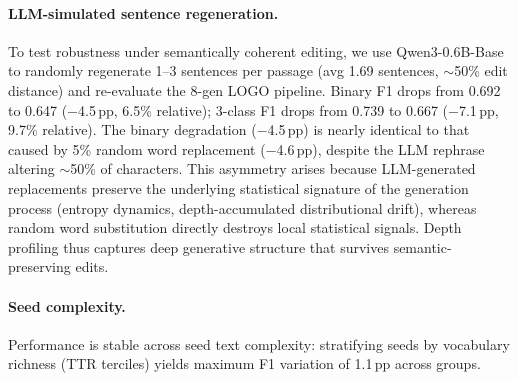 \paragraph{LLM-simulated sentence regeneration.}
To test robustness under semantically coherent editing, we use Qwen3-0.6B-Base to randomly regenerate 1--3 sentences per passage (avg 1.69 sentences, ${\sim}$50\% edit distance) and re-evaluate the 8-gen LOGO pipeline.
Binary F1 drops from 0.692 to 0.647 ($-$4.5\,pp, 6.5\% relative); 3-class F1 drops from 0.739 to 0.667 ($-$7.1\,pp, 9.7\% relative).
The binary degradation ($-$4.5\,pp) is nearly identical to that caused by 5\% random word replacement ($-$4.6\,pp), despite the LLM rephrase altering ${\sim}$50\% of characters.
This asymmetry arises because LLM-generated replacements preserve the underlying statistical signature of the generation process (entropy dynamics, depth-accumulated distributional drift), whereas random word substitution directly destroys local statistical signals.
Depth profiling thus captures deep generative structure that survives semantic-preserving edits.

\paragraph{Seed complexity.}
Performance is stable across seed text complexity: stratifying seeds by vocabulary richness (TTR terciles) yields maximum F1 variation of 1.1\,pp across groups.
